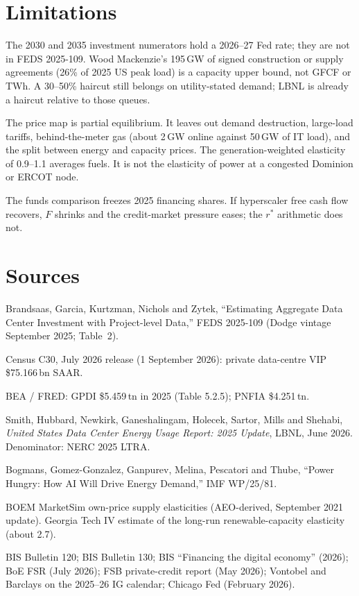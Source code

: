 \documentclass[11pt]{article}
\begin{document}
\section{Limitations}

The 2030 and 2035 investment numerators hold a 2026--27 Fed rate; they are
not in FEDS 2025-109. Wood Mackenzie's 195\,GW of signed construction or
supply agreements (26\% of 2025 US peak load) is a capacity upper bound,
not GFCF or TWh. A 30--50\% haircut still belongs on utility-stated demand;
LBNL is already a haircut relative to those queues.

The price map is partial equilibrium. It leaves out demand destruction,
large-load tariffs, behind-the-meter gas (about 2\,GW online against 50\,GW
of IT load), and the split between energy and capacity prices. The
generation-weighted elasticity of 0.9--1.1 averages fuels. It is not the
elasticity of power at a congested Dominion or ERCOT node.

The funds comparison freezes 2025 financing shares. If hyperscaler free
cash flow recovers, $F$ shrinks and the credit-market pressure eases; the
$r^*$ arithmetic does not.

\section*{Sources}

Brandsaas, Garcia, Kurtzman, Nichols and Zytek, ``Estimating Aggregate Data
Center Investment with Project-level Data,'' FEDS 2025-109 (Dodge vintage
September 2025; Table~2).

Census C30, July 2026 release (1 September 2026): private data-centre VIP
\$75.166\,bn SAAR.

BEA / FRED: GPDI \$5.459\,tn in 2025 (Table 5.2.5); PNFIA \$4.251\,tn.

Smith, Hubbard, Newkirk, Ganeshalingam, Holecek, Sartor, Mills and Shehabi,
\emph{United States Data Center Energy Usage Report: 2025 Update}, LBNL,
June 2026. Denominator: NERC 2025 LTRA.

Bogmans, Gomez-Gonzalez, Ganpurev, Melina, Pescatori and Thube, ``Power Hungry:
How AI Will Drive Energy Demand,'' IMF WP/25/81.

BOEM MarketSim own-price supply elasticities (AEO-derived, September 2021
update). Georgia Tech IV estimate of the long-run renewable-capacity elasticity
(about 2.7).

BIS Bulletin 120; BIS Bulletin 130; BIS ``Financing the digital economy''
(2026); BoE FSR (July 2026); FSB private-credit report (May 2026); Vontobel and
Barclays on the 2025--26 IG calendar; Chicago Fed (February 2026).
\end{document}
